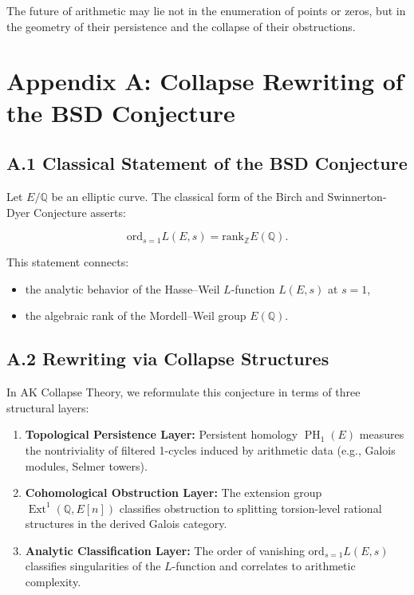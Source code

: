 \documentclass[11pt]{article}
\DeclareMathOperator{\Ext}{Ext}
\DeclareMathOperator{\PH}{PH}
\newcommand{\QQ}{\mathbb{Q}}
\newcommand{\ZZ}{\mathbb{Z}}
\begin{document}
The future of arithmetic may lie not in the enumeration of points or zeros, but in the geometry of their persistence and the collapse of their obstructions.




\section*{Appendix A: Collapse Rewriting of the BSD Conjecture}

\subsection*{A.1 Classical Statement of the BSD Conjecture}

Let $E/\QQ$ be an elliptic curve.  
The classical form of the Birch and Swinnerton-Dyer Conjecture asserts:

\[
\mathrm{ord}_{s=1} L(E,s) = \mathrm{rank}_{\ZZ} E(\QQ).
\]

This statement connects:
\begin{itemize}
  \item the analytic behavior of the Hasse–Weil $L$-function $L(E,s)$ at $s=1$,
  \item the algebraic rank of the Mordell–Weil group $E(\QQ)$.
\end{itemize}

\subsection*{A.2 Rewriting via Collapse Structures}

In AK Collapse Theory, we reformulate this conjecture in terms of three structural layers:

\begin{enumerate}
  \item \textbf{Topological Persistence Layer:}  
  Persistent homology $\PH_1(E)$ measures the nontriviality of filtered 1-cycles induced by arithmetic data (e.g., Galois modules, Selmer towers).
  \item \textbf{Cohomological Obstruction Layer:}  
  The extension group $\Ext^1(\QQ,E[n])$ classifies obstruction to splitting torsion-level rational structures in the derived Galois category.
  \item \textbf{Analytic Classification Layer:}  
  The order of vanishing $\mathrm{ord}_{s=1} L(E,s)$ classifies singularities of the $L$-function and correlates to arithmetic complexity.
\end{enumerate}
\end{document}
